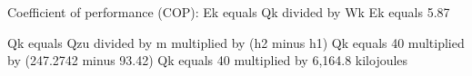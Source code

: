Coefficient of performance (COP):  
Ek equals Qk divided by Wk  
Ek equals 5.87  

Qk equals Qzu divided by m multiplied by (h2 minus h1)  
Qk equals 40 multiplied by (247.2742 minus 93.42)  
Qk equals 40 multiplied by 6,164.8 kilojoules